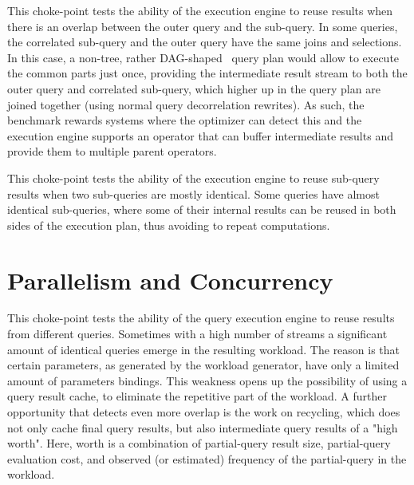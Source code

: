 


This choke-point tests the ability of the execution engine to reuse results when there is an overlap between the outer query and the sub-query. In some queries, the correlated sub-query and the outer query have the same joins and selections.
In this case, a non-tree, rather DAG-shaped~\cite{DBLP:conf/btw/NeumannM09} query plan would allow to execute the common parts just once, providing the intermediate result stream to both the outer query and correlated sub-query,
which higher up in the query plan are joined together (using normal query decorrelation rewrites).
As such, the benchmark rewards systems where the optimizer can detect this and the execution engine supports an operator that can buffer intermediate results and provide them to multiple parent operators.




This choke-point tests the ability of the execution engine to reuse sub-query results when two sub-queries are mostly identical.
Some queries have almost identical sub-queries, where some of their internal results can be reused in both sides of the execution plan, thus avoiding to repeat computations.




\section{Parallelism and Concurrency}


This choke-point tests the ability of the query execution engine to reuse results from different queries. Sometimes with a high number of streams a significant amount of identical queries emerge in the resulting workload.
The reason is that certain parameters, as generated by the workload generator, have only a limited amount of parameters bindings.
This weakness opens up the possibility of using a query result cache, to eliminate the repetitive part of the workload.
A further opportunity that detects even more overlap is the work on recycling, which does not only cache final query results, but also intermediate query results of a "high worth".
Here, worth is a combination of partial-query result size, partial-query evaluation cost, and observed (or estimated) frequency of the partial-query in the workload.

